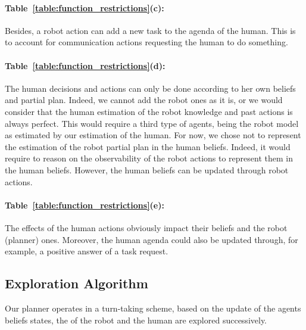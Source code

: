\documentclass[a4paper,11pt,twoside]{StyleThese}
\begin{document}
\paragraph{Table~\ref{table:function_restrictions}(c):} Besides, a robot action can add a new task to the agenda of the human. This is to account for communication actions requesting the human to do something.

\paragraph{Table~\ref{table:function_restrictions}(d):} The human decisions and actions can only be done according to her own beliefs and partial plan. Indeed, we cannot add the robot ones as it is, or we would consider that the human estimation of the robot knowledge and past actions is always perfect. This would require a third type of agents, being the robot model as estimated by our estimation of the human. For now, we chose not to represent the estimation of the robot partial plan in the human beliefs. Indeed, it would require to reason on the observability of the robot actions to represent them in the human beliefs. However, the human beliefs can be updated through robot actions.

\paragraph{Table~\ref{table:function_restrictions}(e):} The effects of the human actions obviously impact their beliefs and the robot (planner) ones. Moreover, the human agenda could also be updated through, for example, a positive answer of a task request.


\subsection{Exploration Algorithm}
Our planner operates in a turn-taking scheme, based on the update of the agents beliefs states, the  of the robot and the human are explored successively.
\end{document}
